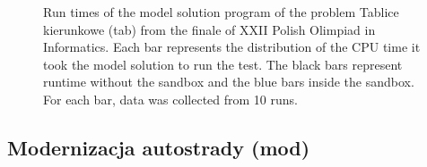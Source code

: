 \documentclass[en]{pracamgr}
\begin{document}
\begin{appendices}
\begin{figure}[H]
\caption{Run times of the model solution program of the problem Tablice kierunkowe (tab) from the finale of XXII Polish Olimpiad in Informatics. Each bar represents the distribution of the CPU time it took the model solution to run the test. The black bars represent runtime without the sandbox and the blue bars inside the sandbox. For each bar, data was collected from 10 runs.}
\label{figure:tab_model_solution_cpu_time}
\end{figure}

\subsection{Modernizacja autostrady (mod)}


\end{appendices}
\end{document}
